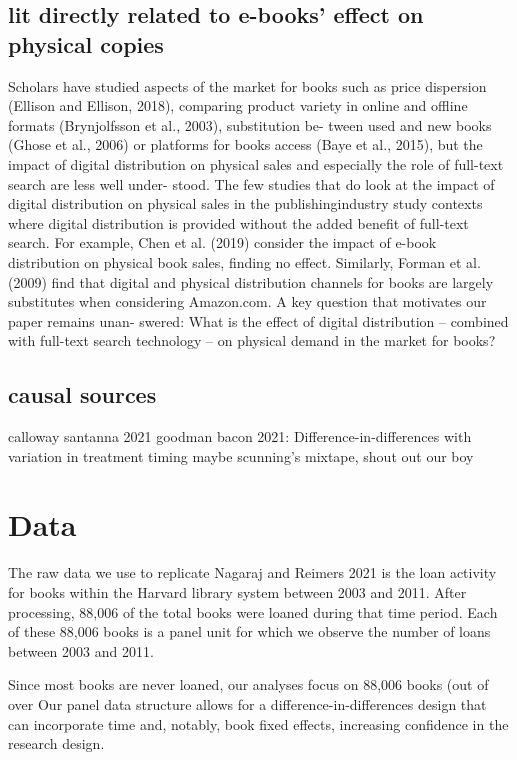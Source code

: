 \documentclass{article}
\begin{document}
\subsection{lit directly related to e-books' effect on physical copies}
Scholars have studied aspects of the market for books such as price dispersion (Ellison and Ellison, 2018), comparing product variety in online and offline formats (Brynjolfsson et al., 2003), substitution be- tween used and new books (Ghose et al., 2006) or platforms for books access (Baye et al., 2015), but the impact of digital distribution on physical sales and especially the role of full-text search are less well under- stood. The few studies that do look at the impact of digital distribution on physical sales in the publishingindustry study contexts where digital distribution is provided without the added benefit of full-text search. For example, Chen et al. (2019) consider the impact of e-book distribution on physical book sales, finding no effect. Similarly, Forman et al. (2009) find that digital and physical distribution channels for books are largely substitutes when considering Amazon.com. A key question that motivates our paper remains unan- swered: What is the effect of digital distribution – combined with full-text search technology – on physical demand in the market for books?

\subsection{causal sources}
calloway santanna 2021
goodman bacon 2021: Difference-in-differences with variation in treatment timing
maybe scunning's mixtape, shout out our boy

\section{Data}

The raw data we use to replicate Nagaraj and Reimers 2021 is the loan activity for books within the Harvard library system between 2003 and 2011. After processing, 88,006 of the total books were loaned during that time period. Each of these 88,006 books is a panel unit for which we observe the number of loans between 2003 and 2011. 



Since most books are never loaned, our analyses focus on 88,006 books (out of over   Our panel data structure allows for a difference-in-differences design that can incorporate time and, notably, book fixed effects, increasing confidence in the research design.
\end{document}
